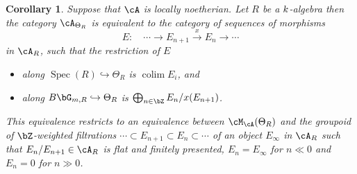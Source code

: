 \documentclass[a4paper]{amsart}
\numberwithin{equation}{section}
\theoremstyle{plain}
\newtheorem{cor}[thm]{Corollary}
\theoremstyle{definition}
\DeclareMathOperator{\Spec}{Spec}
\newcommand{\hookarr}{\hookrightarrow}
\DeclareMathOperator{\colim}{colim}
\newcommand{\co}{\colon}
\begin{document}
\begin{cor}\label{C:reese-ThetaR} Suppose that $\cA$ is locally noetherian. Let $R$ be a $k$-algebra then the category $\cA_{\Theta_R}$ is equivalent to the category of sequences of morphisms
	$$E \co \quad \cdots \to E_{n+1} \xrightarrow{x} E_{n} \to \cdots$$
	in $\cA_R$, such that the restriction of $E$
	\begin{itemize}
		\item along $\Spec(R) \hookarr \Theta_R$ is $\colim E_i$, and
		\item along $B \bG_{m,R} \hookarr \Theta_R$ is $\bigoplus_{n \in \bZ}  E_{n}/x(E_{n+1})$.
	\end{itemize}
	This equivalence restricts to an equivalence between $\cM_{\cA}(\Theta_R)$ and the groupoid of $\bZ$-weighted filtrations $\cdots \subset E_{n+1} \subset E_{n} \subset \cdots$ of an object $E_{\infty}$ in $\cA_R$ such that $E_{n}/E_{n+1} \in \cA_R$ is flat and finitely presented, $E_n = E_{\infty}$ for $n \ll 0$ and $E_n = 0 $ for $n \gg 0$.
\end{cor}	
\end{document}
